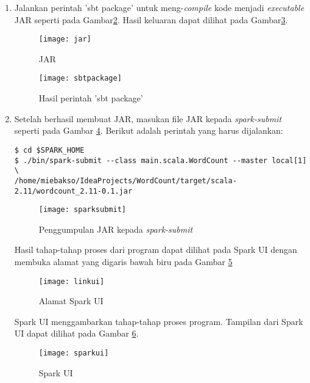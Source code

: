 \begin{enumerate}
Setelah itu, tambahkan kode berikut seperti pada Gambar\ref{fig:kodeword}.

\begin{figure}[H]
    \centering  
    \texttt{[image: kodeword]}  
    \caption[Kode WordCount]{Kode WordCount} 
    \label{fig:kodeword} 
\end{figure}

\item Jalankan perintah 'sbt package' untuk meng-\textit{compile} kode menjadi \textit{executable} JAR seperti pada Gambar\ref{fig:jar}. Hasil keluaran dapat dilihat pada Gambar\ref{fig:sbtpackage}.

\begin{figure}[H]
    \centering  
    \texttt{[image: jar]}  
    \caption[JAR]{JAR} 
    \label{fig:jar} 
\end{figure}

\begin{figure}[H]
    \centering  
    \texttt{[image: sbtpackage]}  
    \caption[Hasil perintah 'sbt package']{Hasil perintah 'sbt package'} 
    \label{fig:sbtpackage} 
\end{figure}

\item Setelah berhasil membuat JAR, masukan file JAR kepada \textit{spark-submit} seperti pada Gambar \ref{fig:sparksubmit}. Berikut adalah perintah yang harus dijalankan: 

\begin{verbatim}
$ cd $SPARK_HOME
$ ./bin/spark-submit --class main.scala.WordCount --master local[1] \
/home/miebakso/IdeaProjects/WordCount/target/scala-2.11/wordcount_2.11-0.1.jar 
\end{verbatim}

\begin{figure}[H]
    \centering  
    \texttt{[image: sparksubmit]}  
    \caption[Penggumpulan JAR kepada \textit{spark-submit}]{Penggumpulan JAR kepada \textit{spark-submit}} 
    \label{fig:sparksubmit} 
\end{figure}

Hasil tahap-tahap proses dari program dapat dilihat pada Spark UI dengan membuka alamat yang digaris bawah biru pada Gambar \ref{fig:linkui}

\begin{figure}[H]
    \centering  
    \texttt{[image: linkui]}  
    \caption[Alamat Spark UI]{Alamat Spark UI} 
    \label{fig:linkui} 
\end{figure}

Spark UI menggambarkan tahap-tahap proses program. Tampilan dari Spark UI dapat dilihat pada Gambar \ref{fig:sparkui}.
\begin{figure}[H]
    \centering  
    \texttt{[image: sparkui]}  
    \caption[Spark UI]{Spark UI} 
    \label{fig:sparkui} 
\end{figure}





 
\end{enumerate}
